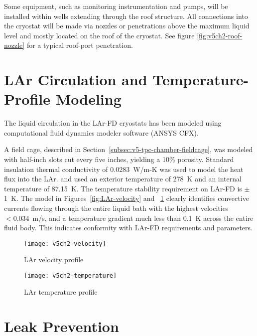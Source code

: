 Some equipment, such as monitoring instrumentation and pumps, will be installed within wells extending through the roof structure. All connections into the cryostat will be made via nozzles or penetrations above the maximum liquid level and 
mostly located on the roof of the cryostat.  See figure \ref{fig:v5ch2-roof-nozzle} for a typical roof-port penetration.  


\section{LAr Circulation and Temperature-Profile Modeling}
\label{sec:cryo-cryosys-temp}

The  liquid circulation in the LAr-FD cryostats has been modeled using computational fluid dynamics modeler software (ANSYS CFX).

A  field cage, described in Section~\ref{subsec:v5-tpc-chamber-fieldcage}, was modeled with half-inch slots cut every five inches, yielding a 10\% porosity.  Standard insulation thermal conductivity  of 0.0283~W/m-K was used to model the heat flux into the LAr. 
and used an exterior temperature of 278~K and an internal temperature of 87.15~K.  The temperature stability requirement on LAr-FD is $\pm$1~K.   The model  in Figures~\ref{fig:LAr-velocity} and ~\ref{fig:LAr-temperature} clearly identifies convective currents flowing through the entire liquid bath with the highest velocities $< 0.034$~m/s, and a temperature gradient much less than  0.1~K across the entire fluid body.  This 
indicates conformity with LAr-FD requirements and parameters.

\begin{figure}[htbp]
\centering
\texttt{[image: v5ch2-velocity]}
\caption{LAr velocity profile} 
\label{fig:LAr-velocity}

\centering
\texttt{[image: v5ch2-temperature]}
\caption{LAr temperature profile} 
\label{fig:LAr-temperature}
\end{figure}



\section{Leak Prevention}
\label{sec:cryo-cryosys-leak}


